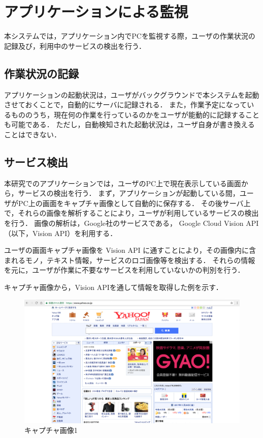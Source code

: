 \section{アプリケーションによる監視}
本システムでは，アプリケーション内でPCを監視する際，ユーザの作業状況の記録及び，利用中のサービスの検出を行う．

\subsection{作業状況の記録}
アプリケーションの起動状況は，ユーザがバックグラウンドで本システムを起動させておくことで，自動的にサーバに記録される．
また，作業予定になっているもののうち，現在何の作業を行っているのかをユーザが能動的に記録することも可能である．
ただし，自動検知された起動状況は，ユーザ自身が書き換えることはできない．

\subsection{サービス検出}
本研究でのアプリケーションでは，ユーザのPC上で現在表示している画面から，サービスの検出を行う．
まず，アプリケーションが起動している間，ユーザがPC上の画面をキャプチャ画像として自動的に保存する．
その後サーバ上で，それらの画像を解析することにより，ユーザが利用しているサービスの検出を行う．
画像の解析は，Google社のサービスである， Google Cloud Vision API （以下，Vision API）を利用する．

ユーザの画面キャプチャ画像を Vision API に通すことにより，その画像内に含まれるモノ，テキスト情報，サービスのロゴ画像等を検出する．
それらの情報を元に，ユーザが作業に不要なサービスを利用していないかの判別を行う．

\clearpage

キャプチャ画像から，Vision APIを通して情報を取得した例を示す．

\begin{figure}[h]
  \begin{center}
  \includegraphics[width=14.0cm]{graphics/screenshot01.png}
  \caption{キャプチャ画像1}
  \label{fig:screenshot01}
  \end{center}
\end{figure}

